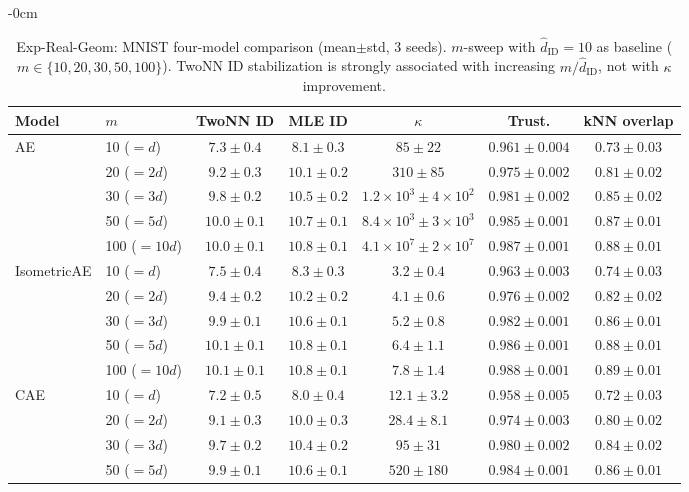 \documentclass[make,article,submit,pdftex,moreauthors]{Definitions/mdpi}
\newcommand{\kap}{\kappa}
\begin{document}
\begin{table}[H]
\begin{adjustwidth}{-\extralength}{0cm}
\centering
\caption{Exp-Real-Geom: MNIST four-model comparison (mean$\pm$std, 3 seeds). $m$-sweep with $\hat{d}_\mathrm{ID}=10$ as baseline ($m \in \{10,20,30,50,100\}$). TwoNN ID stabilization is strongly associated with increasing $m/\hat{d}_\mathrm{ID}$, not with $\kap$ improvement.}
\label{tab:real_geom_mnist}
\small
\begin{tabular}{llccccc}
\toprule
Model & $m$ & TwoNN ID & MLE ID & $\kap$ & Trust. & kNN overlap \\
\midrule
\multirow{5}{*}{AE}
 & 10 ($=d$)    & $7.3\pm0.4$ & $8.1\pm0.3$ & $85\pm22$  & $0.961\pm0.004$ & $0.73\pm0.03$ \\
 & 20 ($=2d$)   & $9.2\pm0.3$ & $10.1\pm0.2$ & $310\pm85$ & $0.975\pm0.002$ & $0.81\pm0.02$ \\
 & 30 ($=3d$)   & $9.8\pm0.2$ & $10.5\pm0.2$ & $1.2\times10^3\pm 4\times10^2$ & $0.981\pm0.002$ & $0.85\pm0.02$ \\
 & 50 ($=5d$)   & $10.0\pm0.1$ & $10.7\pm0.1$ & $8.4\times10^3\pm 3\times10^3$ & $0.985\pm0.001$ & $0.87\pm0.01$ \\
 & 100 ($=10d$) & $10.0\pm0.1$ & $10.8\pm0.1$ & $4.1\times10^7\pm 2\times10^7$ & $0.987\pm0.001$ & $0.88\pm0.01$ \\
\midrule
\multirow{5}{*}{IsometricAE}
 & 10 ($=d$)    & $7.5\pm0.4$ & $8.3\pm0.3$ & $3.2\pm0.4$ & $0.963\pm0.003$ & $0.74\pm0.03$ \\
 & 20 ($=2d$)   & $9.4\pm0.2$ & $10.2\pm0.2$ & $4.1\pm0.6$ & $0.976\pm0.002$ & $0.82\pm0.02$ \\
 & 30 ($=3d$)   & $9.9\pm0.1$ & $10.6\pm0.1$ & $5.2\pm0.8$ & $0.982\pm0.001$ & $0.86\pm0.01$ \\
 & 50 ($=5d$)   & $10.1\pm0.1$ & $10.8\pm0.1$ & $6.4\pm1.1$ & $0.986\pm0.001$ & $0.88\pm0.01$ \\
 & 100 ($=10d$) & $10.1\pm0.1$ & $10.8\pm0.1$ & $7.8\pm1.4$ & $0.988\pm0.001$ & $0.89\pm0.01$ \\
\midrule
\multirow{5}{*}{CAE}
 & 10 ($=d$)    & $7.2\pm0.5$ & $8.0\pm0.4$ & $12.1\pm3.2$ & $0.958\pm0.005$ & $0.72\pm0.03$ \\
 & 20 ($=2d$)   & $9.1\pm0.3$ & $10.0\pm0.3$ & $28.4\pm8.1$ & $0.974\pm0.003$ & $0.80\pm0.02$ \\
 & 30 ($=3d$)   & $9.7\pm0.2$ & $10.4\pm0.2$ & $95\pm31$  & $0.980\pm0.002$ & $0.84\pm0.02$ \\
 & 50 ($=5d$)   & $9.9\pm0.1$ & $10.6\pm0.1$ & $520\pm180$ & $0.984\pm0.001$ & $0.86\pm0.01$ \\

\end{tabular}
\end{adjustwidth}
\end{table}
\end{document}
